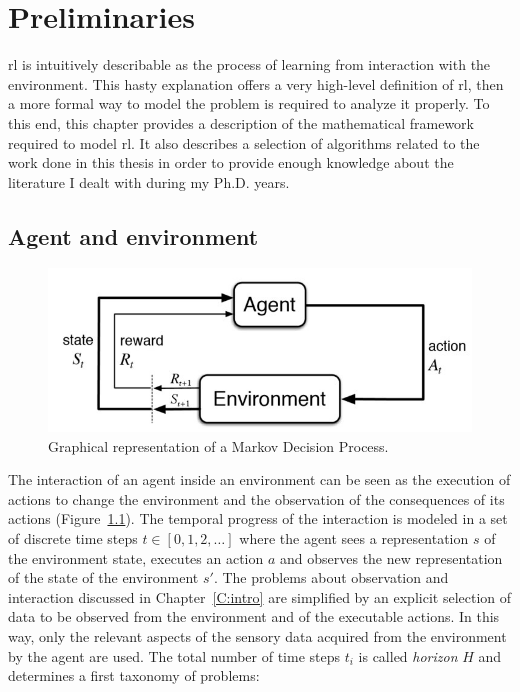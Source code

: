 \chapter{Preliminaries}\label{C:soa}
\gls{rl} is intuitively describable as the process of learning from interaction with the environment. This hasty explanation offers a very high-level definition of \gls{rl}, then a more formal way to model the problem is required to analyze it properly. To this end, this chapter provides a description of the mathematical framework required to model \gls{rl}. It also describes a selection of algorithms related to the work done in this thesis in order to provide enough knowledge about the literature I dealt with during my Ph.D. years.

\section{Agent and environment}
\begin{figure}[b]
\begin{minipage}{\textwidth}
\begin{center}
  \includegraphics[scale=.75]{img/mdp1.jpg}
\end{center}
\end{minipage}
\caption[Markov Decision Process scheme]{Graphical representation of a Markov Decision Process.}\label{F:mdp1}
\end{figure}
The interaction of an agent inside an environment can be seen as the execution of actions to change the environment and the observation of the consequences of its actions (Figure~\ref{F:mdp1}). The temporal progress of the interaction is modeled in a set of discrete time steps $t \in [0, 1, 2, \dots]$ where the agent sees a representation $s$ of the environment state, executes an action $a$ and observes the new representation of the state of the environment $s'$. The problems about observation and interaction discussed in Chapter~\ref{C:intro} are simplified by an explicit selection of data to be observed from the environment and of the executable actions. In this way, only the relevant aspects of the sensory data acquired from the environment by the agent are used. The total number of time steps $t_i$ is called \textit{horizon} $H$ and determines a first taxonomy of problems:
